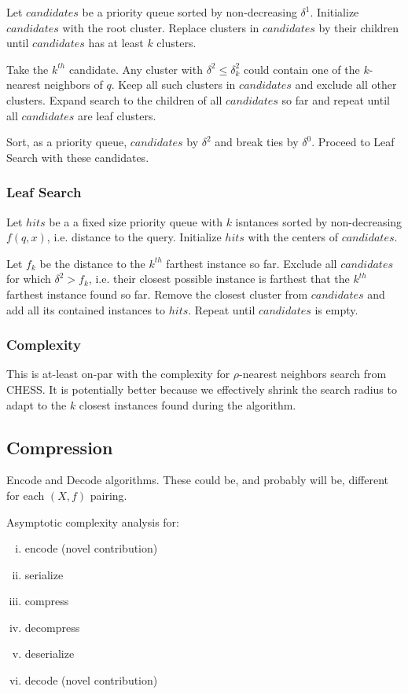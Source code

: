 Let $candidates$ be a priority queue sorted by non-decreasing $\delta^1$.
Initialize $candidates$ with the root cluster.
Replace clusters in $candidates$ by their children until $candidates$ has at least $k$ clusters.

Take the $k^{th}$ candidate.
Any cluster with $\delta^2 \leq \delta^2_k$ could contain one of the $k$-nearest neighbors of $q$.
Keep all such clusters in $candidates$ and exclude all other clusters.
Expand search to the children of all $candidates$ so far and repeat until all $candidates$ are leaf clusters.

Sort, as a priority queue, $candidates$ by $\delta^2$ and break ties by $\delta^0$.
Proceed to Leaf Search with these candidates.

\subsubsection{Leaf Search}
\label{subsubsec:methods:knn-search:leaf-search}

Let $hits$ be a a fixed size priority queue with $k$ isntances sorted by non-decreasing $f(q, x)$, i.e. distance to the query.
Initialize $hits$ with the centers of $candidates$.

Let $f_k$ be the distance to the $k^{th}$ farthest instance so far.
Exclude all $candidates$ for which $\delta^2 > f_k$, i.e. their closest possible instance is farthest that the $k^{th}$ farthest instance found so far.
Remove the closest cluster from $candidates$ and add all its contained instances to $hits$.
Repeat until $candidates$ is empty.

\subsubsection{Complexity}
\label{subsubsec:methods:knn-search:complexity}

This is at-least on-par with the complexity for $\rho$-nearest neighbors search from CHESS.
It is potentially better because we effectively shrink the search radius to adapt to the $k$ closest instances found during the algorithm.

\subsection{Compression}
\label{subsec:methods:compression}

Encode and Decode algorithms.
These could be, and probably will be, different for each $(X, f)$ pairing.

Asymptotic complexity analysis for:
\begin{enumerate}[i.]
    \item encode (novel contribution)
    \item serialize
    \item compress
    \item decompress
    \item deserialize
    \item decode (novel contribution)
\end{enumerate}

